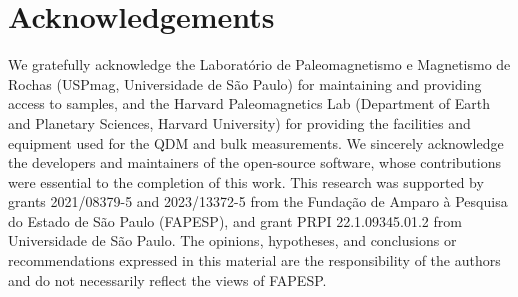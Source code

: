 \section{Acknowledgements}

We gratefully acknowledge the Laboratório de Paleomagnetismo e Magnetismo de Rochas (USPmag, Universidade de São Paulo) for maintaining and providing access to samples, and the Harvard Paleomagnetics Lab (Department of Earth and Planetary Sciences, Harvard University) for providing the facilities and equipment used for the QDM and bulk measurements. We sincerely acknowledge the developers and maintainers of the open-source software, whose contributions were essential to the completion of this work. This research was supported by grants 2021/08379-5 and 2023/13372-5 from the Fundação de Amparo à Pesquisa do Estado de São Paulo (FAPESP), and grant PRPI 22.1.09345.01.2 from Universidade de São Paulo.
The opinions, hypotheses, and conclusions or recommendations expressed in this material are the responsibility of the authors and do not necessarily reflect the views of FAPESP.


